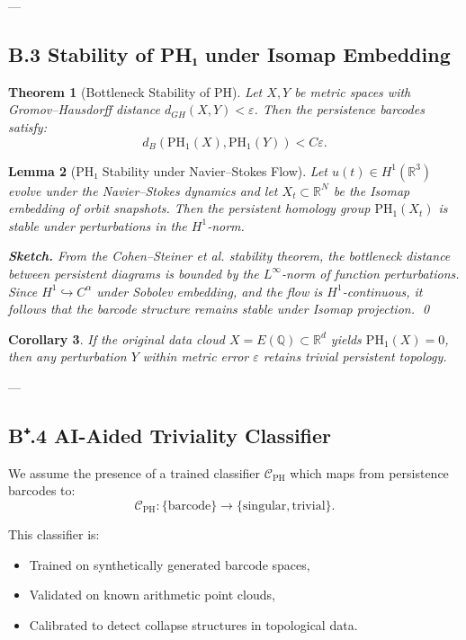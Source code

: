 \documentclass[11pt]{article}
\newtheorem{theorem}{Theorem}[section]
\newtheorem{lemma}[theorem]{Lemma}
\newtheorem{corollary}[theorem]{Corollary}
\theoremstyle{definition}
\begin{document}
---

\subsection*{B.3 Stability of PH₁ under Isomap Embedding}

\begin{theorem}[Bottleneck Stability of PH]
Let \( X, Y \) be metric spaces with Gromov–Hausdorff distance \( d_{GH}(X, Y) < \varepsilon \).  
Then the persistence barcodes satisfy:
\[
d_B(\mathrm{PH}_1(X), \mathrm{PH}_1(Y)) < C \varepsilon.
\]
\end{theorem}

\begin{lemma}[PH₁ Stability under Navier–Stokes Flow]
Let \( u(t) \in H^1(\mathbb{R}^3) \) evolve under the Navier–Stokes dynamics and let \( X_t \subset \mathbb{R}^N \) be the Isomap embedding of orbit snapshots.  
Then the persistent homology group \( \mathrm{PH}_1(X_t) \) is stable under perturbations in the \( H^1 \)-norm.

\textbf{Sketch.}  
From the Cohen–Steiner et al. stability theorem, the bottleneck distance between persistent diagrams is bounded by the \( L^\infty \)-norm of function perturbations.  
Since \( H^1 \hookrightarrow C^\alpha \) under Sobolev embedding, and the flow is \( H^1 \)-continuous, it follows that the barcode structure remains stable under Isomap projection.
\qed
\end{lemma}

\begin{corollary}
If the original data cloud \( X = E(\mathbb{Q}) \subset \mathbb{R}^d \) yields \( \mathrm{PH}_1(X) = 0 \),  
then any perturbation \( Y \) within metric error \( \varepsilon \) retains trivial persistent topology.
\end{corollary}


---

\subsection*{B⁺.4 AI-Aided Triviality Classifier}

We assume the presence of a trained classifier \( \mathcal{C}_{\mathrm{PH}} \) which maps from persistence barcodes to:
\[
\mathcal{C}_{\mathrm{PH}}: \{\text{barcode}\} \to \{\text{singular}, \text{trivial}\}.
\]

This classifier is:
\begin{itemize}
  \item Trained on synthetically generated barcode spaces,
  \item Validated on known arithmetic point clouds,
  \item Calibrated to detect collapse structures in topological data.
\end{itemize}
\end{document}
